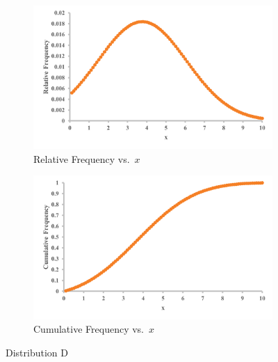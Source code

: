 \documentclass[12pt]{article}
\begin{document}
\begin{figure}[h!]
    \centering
    \begin{subfigure}[b]{0.45\textwidth}
        \includegraphics[width=\textwidth]{graphs/DistD_Rel.png}
        \caption{Relative Frequency vs.\ \(x\)}
    \end{subfigure}
    \hfill
    \begin{subfigure}[b]{0.45\textwidth}
        \includegraphics[width=\textwidth]{graphs/DistD_Cumul.png}
        \caption{Cumulative Frequency vs.\ \(x\)}
    \end{subfigure}
    \label{fig:distD}
    \caption{Distribution D}
\end{figure}
\end{document}

